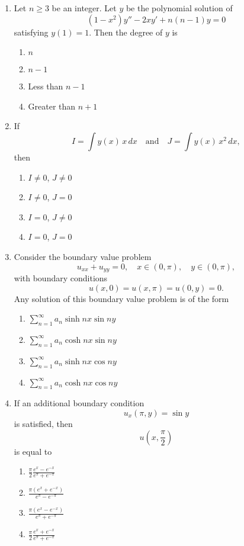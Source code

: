 \documentclass[journal]{IEEEtran}
\numberwithin{equation}{enumi}
\numberwithin{figure}{enumi}
\begin{document}
\begin{enumerate}
\item
Let $n \geq 3$ be an integer. Let $y$ be the polynomial solution of
\[
(1 - x^2) y'' - 2 x y' + n(n-1) y = 0
\]
satisfying $y(1) = 1$. Then the degree of $y$ is
\hfill{}
\begin{multicols}{2}
\begin{enumerate}
    \item $n$
    \item $n-1$
    \item Less than $n-1$
    \item Greater than $n+1$
\end{enumerate}
\end{multicols}

\item
If
\[
I = \int y(x) \, x \, dx \quad \text{and} \quad J = \int y(x) \, x^2 \, dx,
\]
then
\hfill{}
\begin{multicols}{2}
\begin{enumerate}
    \item $I \neq 0$, $J \neq 0$
    \item $I \neq 0$, $J = 0$
    \item $I = 0$, $J \neq 0$
    \item $I = 0$, $J = 0$
\end{enumerate}
\end{multicols}

\item
Consider the boundary value problem
\[
u_{xx} + u_{yy} = 0, \quad x \in (0,\pi), \quad y \in (0,\pi),
\]
with boundary conditions
\[
u(x, 0) = u(x, \pi) = u(0, y) = 0.
\]
Any solution of this boundary value problem is of the form
\hfill{}
\begin{multicols}{2}
\begin{enumerate}
    \item $\sum_{n=1}^\infty a_n \sinh nx \sin ny$
    \item $\sum_{n=1}^\infty a_n \cosh nx \sin ny$
    \item $\sum_{n=1}^\infty a_n \sinh nx \cos ny$
    \item $\sum_{n=1}^\infty a_n \cosh nx \cos ny$
\end{enumerate}
\end{multicols}

\item
If an additional boundary condition
\[
u_x(\pi, y) = \sin y
\]
is satisfied, then 
\[
u\left(x, \frac{\pi}{2}\right)
\]
is equal to
\hfill{}
\begin{multicols}{4}
\begin{enumerate}
    \item $\frac{\pi}{2} \frac{e^x - e^{-x}}{e^\pi + e^{-\pi}}$
    \item $\frac{\pi (e^x + e^{-x})}{e^\pi - e^{-\pi}}$
    \item $\frac{\pi (e^x - e^{-x})}{e^\pi + e^{-\pi}}$
    \item $\frac{\pi}{2} \frac{e^x + e^{-x}}{e^\pi + e^{-\pi}}$
\end{enumerate}
\end{multicols}


\end{enumerate}
\end{document}
